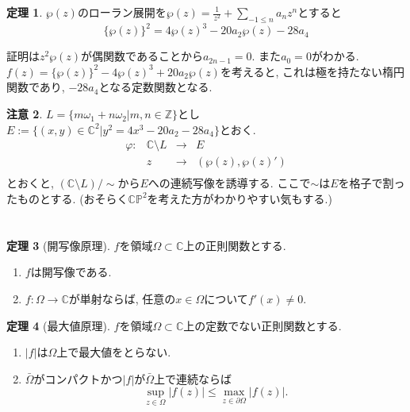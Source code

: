 \documentclass[dvipdfmx,a4paper,11pt]{article}
\newcommand{\Z}{\mathbb{Z}}
\newcommand{\C}{\mathbb{C}}
\theoremstyle{definition}
\newtheorem{thm}{定理}
\newtheorem{rem}[thm]{注意}
\begin{document}
\begin{tcolorbox}[
    colback = white,
    colframe = green!35!black,
    fonttitle = \bfseries,
    breakable = true]
    \begin{thm}
   $\wp(z)$のローラン展開を$\wp(z) = \frac{1}{z^2} + \sum_{ -1 \le n}a_{n} z^n$とすると
    $$
\{ \wp(z)\}^{2}   = 4 \wp(z)^3 - 20 a_2 \wp(z) -28 a_4 $$
    \end{thm}
\end{tcolorbox} 
証明は$z^2 \wp(z)$が偶関数であることから$a_{2n-1}=0$. また$a_0=0$がわかる.
$f(z)=\{ \wp(z)\}^{2}  - 4 \wp(z)^3 +20 a_2 \wp(z) $を考えると, これは極を持たない楕円関数であり, $-28 a_4$となる定数関数となる.

\begin{rem}
$L = \{ m \omega_1 + n\omega_2 | m,n \in \Z\}$とし
$E:= \{ (x,y) \in \C^2 | y^2 = 4x^3 - 20 a_2 - 28a_4\}$とおく.
$$
\begin{array}{cccc}
\varphi : & \C \setminus L  &\rightarrow &E\\
&z &\rightarrow & (\wp(z), \wp(z)')\\
\end{array}
$$
とおくと, $(\C \setminus L) / \sim$から$E$への連続写像を誘導する. ここで$\sim$は$E$を格子で割ったものとする.
(おそらく$\C\mathbb{P}^2$を考えた方がわかりやすい気もする.)
\end{rem}

\section{}


\begin{tcolorbox}[
    colback = white,
    colframe = green!35!black,
    fonttitle = \bfseries,
    breakable = true]
    \begin{thm}[開写像原理]
$f$を領域$\Omega \subset \C$上の正則関数とする.
\begin{enumerate}
    \setlength{\parskip}{0cm} 
  \setlength{\itemsep}{0cm} 
\item $f$は開写像である. 
\item $f : \Omega \rightarrow \C$が単射ならば, 任意の$x \in \Omega$について$f'(x) \neq 0$.
\end{enumerate}

    \end{thm}
\end{tcolorbox}

\begin{tcolorbox}[
    colback = white,
    colframe = green!35!black,
    fonttitle = \bfseries,
    breakable = true]
    \begin{thm}[最大値原理]
$f$を領域$\Omega \subset \C$上の定数でない正則関数とする.
\begin{enumerate}
    \setlength{\parskip}{0cm} 
  \setlength{\itemsep}{0cm} 
\item $|f|$は$\Omega$上で最大値をとらない.
\item $\bar{\Omega}$がコンパクトかつ$|f|$が$\bar{\Omega}$上で連続ならば
$$
\sup_{z \in \Omega} |f (z)| \le \max_{z \in \partial \Omega}|f(z)|. 
$$
\end{enumerate}
    \end{thm}
\end{tcolorbox}
\end{document}

